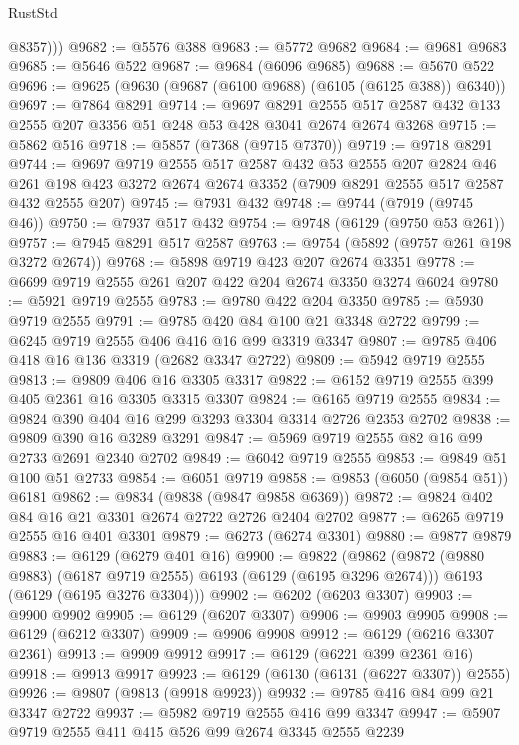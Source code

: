 \begin{lexlean}{RustStd}
\begin{coremodule}
          @8357)))
@9682 := @5576 @388
@9683 := @5772 @9682
@9684 := @9681 @9683
@9685 := @5646 @522
@9687 := @9684 (@6096 @9685)
@9688 := @5670 @522
@9696 := @9625 (@9630 (@9687 (@6100 @9688) (@6105 (@6125 @388)) @6340))
@9697 := @7864 @8291
@9714 := @9697
    @8291
    @2555
    @517
    @2587
    @432
    @133
    @2555
    @207
    @3356
    @51
    @248
    @53
    @428
    @3041
    @2674
    @2674
    @3268
@9715 := @5862 @516
@9718 := @5857 (@7368 (@9715 @7370))
@9719 := @9718 @8291
@9744 := @9697
    @9719
    @2555
    @517
    @2587
    @432
    @53
    @2555
    @207
    @2824
    @46
    @261
    @198
    @423
    @3272
    @2674
    @2674
    @3352
    (@7909 @8291 @2555 @517 @2587 @432 @2555 @207)
@9745 := @7931 @432
@9748 := @9744 (@7919 (@9745 @46))
@9750 := @7937 @517 @432
@9754 := @9748 (@6129 (@9750 @53 @261))
@9757 := @7945 @8291 @517 @2587
@9763 := @9754 (@5892 (@9757 @261 @198 @3272 @2674))
@9768 := @5898 @9719 @423 @207 @2674 @3351
@9778 := @6699 @9719 @2555 @261 @207 @422 @204 @2674 @3350 @3274 @6024
@9780 := @5921 @9719 @2555
@9783 := @9780 @422 @204 @3350
@9785 := @5930 @9719 @2555
@9791 := @9785 @420 @84 @100 @21 @3348 @2722
@9799 := @6245 @9719 @2555 @406 @416 @16 @99 @3319 @3347
@9807 := @9785 @406 @418 @16 @136 @3319 (@2682 @3347 @2722)
@9809 := @5942 @9719 @2555
@9813 := @9809 @406 @16 @3305 @3317
@9822 := @6152 @9719 @2555 @399 @405 @2361 @16 @3305 @3315 @3307
@9824 := @6165 @9719 @2555
@9834 := @9824 @390 @404 @16 @299 @3293 @3304 @3314 @2726 @2353 @2702
@9838 := @9809 @390 @16 @3289 @3291
@9847 := @5969 @9719 @2555 @82 @16 @99 @2733 @2691 @2340 @2702
@9849 := @6042 @9719 @2555
@9853 := @9849 @51 @100 @51 @2733
@9854 := @6051 @9719
@9858 := @9853 (@6050 (@9854 @51)) @6181
@9862 := @9834 (@9838 (@9847 @9858 @6369))
@9872 := @9824 @402 @84 @16 @21 @3301 @2674 @2722 @2726 @2404 @2702
@9877 := @6265 @9719 @2555 @16 @401 @3301
@9879 := @6273 (@6274 @3301)
@9880 := @9877 @9879
@9883 := @6129 (@6279 @401 @16)
@9900 := @9822
    (@9862
      (@9872 (@9880 @9883) (@6187 @9719 @2555) @6193 (@6129 (@6195 @3296 @2674)))
      @6193
      (@6129 (@6195 @3276 @3304)))
@9902 := @6202 (@6203 @3307)
@9903 := @9900 @9902
@9905 := @6129 (@6207 @3307)
@9906 := @9903 @9905
@9908 := @6129 (@6212 @3307)
@9909 := @9906 @9908
@9912 := @6129 (@6216 @3307 @2361)
@9913 := @9909 @9912
@9917 := @6129 (@6221 @399 @2361 @16)
@9918 := @9913 @9917
@9923 := @6129 (@6130 (@6131 (@6227 @3307)) @2555)
@9926 := @9807 (@9813 (@9918 @9923))
@9932 := @9785 @416 @84 @99 @21 @3347 @2722
@9937 := @5982 @9719 @2555 @416 @99 @3347
@9947 := @5907 @9719 @2555 @411 @415 @526 @99 @2674 @3345 @2555 @2239

\end{coremodule}
\end{lexlean}
